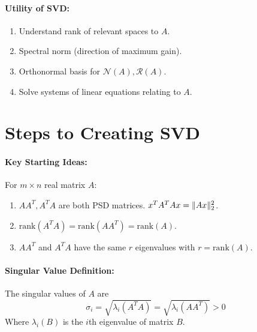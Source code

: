 \documentclass[a4paper,12pt]{report}
\DeclarePairedDelimiter\norm{\lVert}{\rVert}%
\begin{document}
\paragraph{Utility of SVD: } 
\begin{enumerate}
\item Understand rank of relevant spaces to $A$.
\item Spectral norm (direction of maximum gain).
\item Orthonormal basis for $\mathcal{N}(A), \mathcal{R}(A)$.
\item Solve systems of linear equations relating to $A$.
\end{enumerate}


\section{Steps to Creating SVD}

\paragraph{Key Starting Ideas: } For $m\times n$ real matrix $A$: 
\begin{enumerate}
\item $AA^T, A^TA$ are both PSD matrices. $x^T A^TAx = \norm{Ax}_2^2$.
\item $\text{rank}(A^TA) = \text{rank}(AA^T) = \text{rank}(A)$.
\item $AA^T$ and $A^TA$ have the same $r$ eigenvalues with $r = \text{rank}(A)$.
\end{enumerate}

\paragraph{Singular Value Definition: } The singular values of $A$ are 
\begin{equation}
	\sigma_i = \sqrt{\lambda_i(A^TA)} = \sqrt{\lambda_i(AA^T)} > 0
\end{equation}
Where $\lambda_i(B)$ is the $i$th eigenvalue of matrix $B$.
\end{document}
